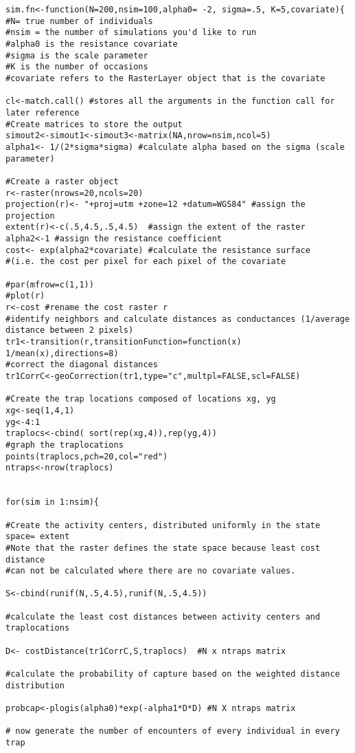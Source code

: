 \documentclass[12pt]{article}
\begin{document}
\begin{spacing}{1.2}
{\begin{verbatim}
sim.fn<-function(N=200,nsim=100,alpha0= -2, sigma=.5, K=5,covariate){
#N= true number of individuals
#nsim = the number of simulations you'd like to run
#alpha0 is the resistance covariate
#sigma is the scale parameter
#K is the number of occasions
#covariate refers to the RasterLayer object that is the covariate

cl<-match.call() #stores all the arguments in the function call for later reference
#Create matrices to store the output
simout2<-simout1<-simout3<-matrix(NA,nrow=nsim,ncol=5)
alpha1<- 1/(2*sigma*sigma) #calculate alpha based on the sigma (scale parameter)

#Create a raster object
r<-raster(nrows=20,ncols=20)
projection(r)<- "+proj=utm +zone=12 +datum=WGS84" #assign the projection
extent(r)<-c(.5,4.5,.5,4.5)  #assign the extent of the raster
alpha2<-1 #assign the resistance coefficient
cost<- exp(alpha2*covariate) #calculate the resistance surface 
#(i.e. the cost per pixel for each pixel of the covariate

#par(mfrow=c(1,1))
#plot(r)
r<-cost #rename the cost raster r
#identify neighbors and calculate distances as conductances (1/average distance between 2 pixels)
tr1<-transition(r,transitionFunction=function(x) 1/mean(x),directions=8)
#correct the diagonal distances 
tr1CorrC<-geoCorrection(tr1,type="c",multpl=FALSE,scl=FALSE) 

#Create the trap locations composed of locations xg, yg
xg<-seq(1,4,1)
yg<-4:1
traplocs<-cbind( sort(rep(xg,4)),rep(yg,4))
#graph the traplocations
points(traplocs,pch=20,col="red")
ntraps<-nrow(traplocs)


for(sim in 1:nsim){

#Create the activity centers, distributed uniformly in the state space= extent
#Note that the raster defines the state space because least cost distance 
#can not be calculated where there are no covariate values.

S<-cbind(runif(N,.5,4.5),runif(N,.5,4.5))

#calculate the least cost distances between activity centers and traplocations 

D<- costDistance(tr1CorrC,S,traplocs)  #N x ntraps matrix

#calculate the probability of capture based on the weighted distance distribution

probcap<-plogis(alpha0)*exp(-alpha1*D*D) #N X ntraps matrix

# now generate the number of encounters of every individual in every trap


\end{verbatim}}
\end{spacing}
\end{document}
